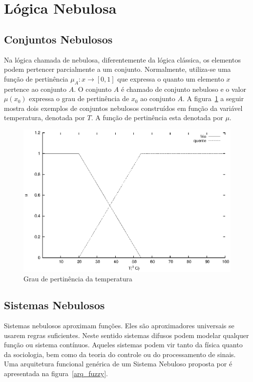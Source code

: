 \section{Lógica Nebulosa}

\subsection{Conjuntos Nebulosos}

Na lógica chamada de nebulosa, diferentemente da lógica clássica, os elementos
podem pertencer parcialmente a um conjunto. Normalmente, utiliza-se uma função
de pertinência $\mu_A : x \rightarrow [0,1]$ que expressa o quanto um elemento
$x$ pertence ao conjunto $A$. O conjunto $A$ é chamado de conjunto nebuloso e o
valor $\mu(x_0)$ expressa o grau de pertinência de $x_0$ ao conjunto $A$. A
figura~\ref{conj_fuzzy} a seguir mostra dois exemplos de conjuntos nebulosos
construídos em função da variável temperatura, denotada por $T$. A função de
pertinência esta denotada por $\mu$.

\begin{figure}
  \includegraphics[width=14cm]{imgs/fuzzy_graphic/fuzzy_graphic.eps}
  \caption{Grau de pertinência da temperatura}
  \label{conj_fuzzy}
\end{figure}

\subsection{Sistemas Nebulosos}

Sistemas nebulosos aproximam funções. Eles são aproximadores universais se
usarem regras suficientes. Neste sentido sistemas difusos podem modelar
qualquer função ou sistema contínuos. Aqueles sistemas podem vir tanto da física
quanto da sociologia, bem como da teoria do controle ou do processamento de
sinais. Uma arquitetura funcional genérica de um Sistema Nebuloso proposta por
\cite{passos2005datamining} é apresentada na figura~\ref{arq_fuzzy}.

